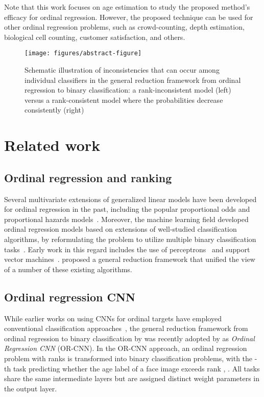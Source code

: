 \documentclass[times,twocolumn,final,authoryear]{elsarticle}
\begin{document}
Note that this work focuses on age estimation to study the proposed method's efficacy for ordinal regression. However, the proposed technique can be used for other ordinal regression problems, such as crowd-counting, depth estimation, biological cell counting, customer satisfaction, and others.

\begin{figure}
\begin{center}
\centerline{\texttt{[image: figures/abstract-figure]}}
\caption{Schematic illustration of inconsistencies that can occur among individual classifiers in the general reduction framework from ordinal regression to binary classification: a rank-inconsistent model (left) versus a rank-consistent model where the probabilities decrease consistently (right)}
\label{fig:inconsistency-issue}
\end{center}
\end{figure}


\section{Related work}
\label{sec:related-work}

\subsection{Ordinal regression and ranking}

Several multivariate extensions of generalized linear models have been developed for ordinal regression in the past, including the popular proportional odds and proportional hazards models~\citep{mccullagh1980regression}. Moreover, the machine learning field developed ordinal regression models based on extensions of well-studied classification algorithms, by reformulating the problem to utilize multiple binary classification tasks~\citep{baccianella2009evaluation}. Early work in this regard includes the use of perceptrons~\citep{crammer2002pranking,shen2005ranking} and support vector machines~\citep{herbrich1999support,shashua2003ranking,rajaram2003classification,chu2005new}. \cite{li2007ordinal} proposed a general reduction framework that unified the view of a number of these existing algorithms.

\subsection{Ordinal regression CNN}

While earlier works on using CNNs for ordinal targets have employed conventional classification approaches~\citep{levi2015age,rothe2015dex}, the general reduction framework from ordinal regression to binary classification by \cite{li2007ordinal} was recently adopted by \cite{niu2016ordinal} as \textit{Ordinal Regression CNN} (OR-CNN). In the OR-CNN approach, an ordinal regression problem with  ranks is transformed into  binary classification problems, with the -th task predicting whether the age label of a face image exceeds rank , . All  tasks share the same intermediate layers but are assigned distinct weight parameters in the output layer. 
\end{document}
